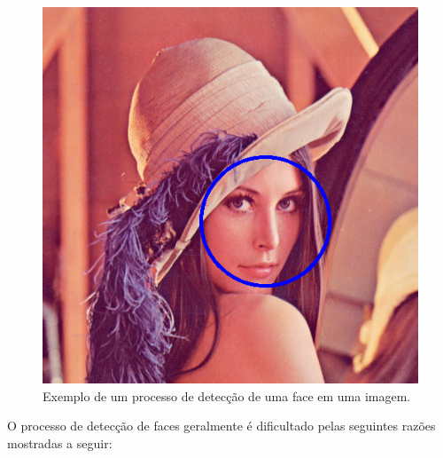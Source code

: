 	\begin{figure}[hbt]
		\begin{center}
			\includegraphics[scale=0.5]{figuras/2.FundamentacaoTeorica/enquadramentoRosto.png}
		\end{center}
		\caption{Exemplo de um processo de detecção de uma face em uma imagem.}
		\label{enquadramentoRosto}
	\end{figure}

O processo de detecção de faces geralmente é dificultado pelas seguintes razões mostradas a seguir:


